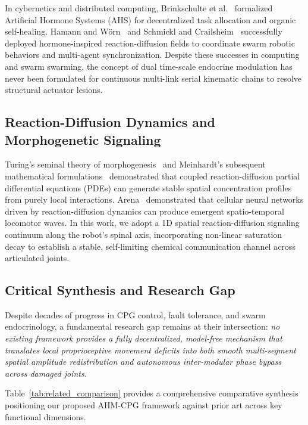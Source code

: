 \documentclass{iopjournal}
\begin{document}
In cybernetics and distributed computing, Brinkschulte et al.~\cite{brinkschulte2007} formalized Artificial Hormone Systems (AHS) for decentralized task allocation and organic self-healing. Hamann and W{\"o}rn~\cite{hamann2008} and Schmickl and Crailsheim~\cite{schmickl2011} successfully deployed hormone-inspired reaction-diffusion fields to coordinate swarm robotic behaviors and multi-agent synchronization. Despite these successes in computing and swarm swarming, the concept of dual time-scale endocrine modulation has never been formulated for continuous multi-link serial kinematic chains to resolve structural actuator lesions.

\subsection{Reaction-Diffusion Dynamics and Morphogenetic Signaling}
Turing's seminal theory of morphogenesis~\cite{turing1952} and Meinhardt's subsequent mathematical formulations~\cite{meinhardt1982} demonstrated that coupled reaction-diffusion partial differential equations (PDEs) can generate stable spatial concentration profiles from purely local interactions. Arena~\cite{arena2000} demonstrated that cellular neural networks driven by reaction-diffusion dynamics can produce emergent spatio-temporal locomotor waves. In this work, we adopt a 1D spatial reaction-diffusion signaling continuum along the robot's spinal axis, incorporating non-linear saturation decay to establish a stable, self-limiting chemical communication channel across articulated joints.

\subsection{Critical Synthesis and Research Gap}
Despite decades of progress in CPG control, fault tolerance, and swarm endocrinology, a fundamental research gap remains at their intersection: \textit{no existing framework provides a fully decentralized, model-free mechanism that translates local proprioceptive movement deficits into both smooth multi-segment spatial amplitude redistribution and autonomous inter-modular phase bypass across damaged joints.}

Table~\ref{tab:related_comparison} provides a comprehensive comparative synthesis positioning our proposed AHM-CPG framework against prior art across key functional dimensions.
\end{document}
